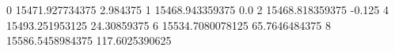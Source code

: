 0 15471.927734375 2.984375
1 15468.943359375 0.0
2 15468.818359375 -0.125
4 15493.251953125 24.30859375
6 15534.7080078125 65.7646484375
8 15586.5458984375 117.6025390625
